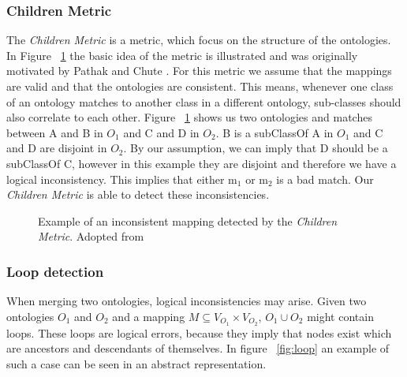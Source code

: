 \documentclass[runningheads]{llncs}
\begin{document}
\subsubsection{Children Metric} \label{children_metric}
The \textit{Children Metric} is a metric, which focus on the structure of the ontologies. In Figure ~\ref{fig:cm} the basic idea of the metric is illustrated and was originally motivated by Pathak and Chute \cite{Pathak}. For this metric we assume that the mappings are valid and that the ontologies are consistent. This means, whenever one class of an ontology matches to another class in a different ontology, sub-classes should also correlate to each other. Figure ~\ref{fig:cm} shows us two ontologies and matches between A and B in $O_1$ and C and D in $O_2$. B is a subClassOf A in $O_1$ and C and D are disjoint in $O_2$. By our assumption, we can imply that D should be a subClassOf C, however in this example they are disjoint and therefore we have a logical inconsistency. This implies that either m$_1$ or m$_2$ is a bad match. Our \textit{Children Metric} is able to detect these inconsistencies.
\begin{figure}[h]
    \centering
    \caption{Example of an inconsistent mapping detected by the \textit{Children Metric}. Adopted from \cite{Pathak}}
    \label{fig:cm}
\end{figure}
\subsubsection{Loop detection} \label{loop_detection}
 When merging two ontologies, logical inconsistencies may arise. Given two ontologies $O_1$ and $O_2$ and a mapping $M \subseteq V_{O_1} \times V_{O_2}$, $O_1 \cup O_2$ might contain loops. These loops are logical errors, because they imply that nodes exist which are ancestors and descendants of themselves. In figure ~\ref{fig:loop} an example of such a case can be seen in an abstract representation.
\end{document}
